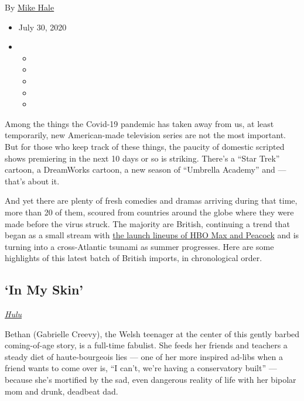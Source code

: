 By \href{https://www.nytimes3xbfgragh.onion/by/mike-hale}{Mike Hale}

\begin{itemize}
\item
  July 30, 2020
\item
  \begin{itemize}
  \item
  \item
  \item
  \item
  \item
  \end{itemize}
\end{itemize}

Among the things the Covid-19 pandemic has taken away from us, at least
temporarily, new American-made television series are not the most
important. But for those who keep track of these things, the paucity of
domestic scripted shows premiering in the next 10 days or so is
striking. There's a ``Star Trek'' cartoon, a DreamWorks cartoon, a new
season of ``Umbrella Academy'' and --- that's about it.

And yet there are plenty of fresh comedies and dramas arriving during
that time, more than 20 of them, scoured from countries around the globe
where they were made before the virus struck. The majority are British,
continuing a trend that began as a small stream with
\href{https://www.nytimes3xbfgragh.onion/2020/07/15/arts/television/capture-intelligence-review-peacock.html}{the
launch lineups of HBO Max and Peacock} and is turning into a
cross-Atlantic tsunami as summer progresses. Here are some highlights of
this latest batch of British imports, in chronological order.

\hypertarget{in-my-skin}{%
\subsection{`In My Skin'}\label{in-my-skin}}

\href{https://www.hulu.com/series/in-my-skin-91be18aa-30c6-40bf-b191-74503708b305}{\emph{Hulu}}

Bethan (Gabrielle Creevy), the Welsh teenager at the center of this
gently barbed coming-of-age story, is a full-time fabulist. She feeds
her friends and teachers a steady diet of haute-bourgeois lies --- one
of her more inspired ad-libs when a friend wants to come over is, ``I
can't, we're having a conservatory built'' --- because she's mortified
by the sad, even dangerous reality of life with her bipolar mom and
drunk, deadbeat dad.

